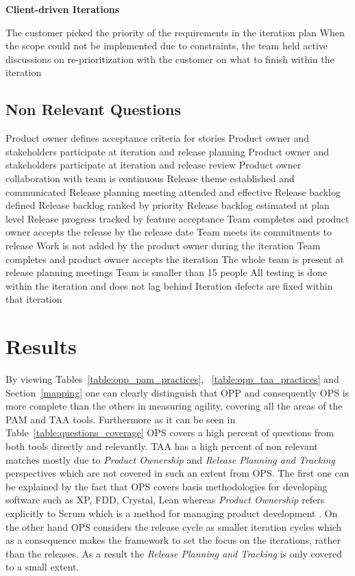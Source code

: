 \textbf{Client-driven Iterations}
\begin{itemize}
	\pam The customer picked the priority of the requirements in the iteration plan
	\pam When the scope could not be implemented due to constraints, the team held  active discussions on re-prioritization with the customer on what to finish within the iteration 
\end{itemize}

\subsection{Non Relevant Questions}

\begin{itemize}
	\taanr Product owner defines acceptance criteria for stories 
	\taanr Product owner and stakeholders participate at iteration and release planning 
	\taanr Product owner and stakeholders participate at iteration and release review 
	\taanr Product owner collaboration with team is continuous 
	\taanr Release theme established and communicated 
	\taanr Release planning meeting attended and effective 
	\taanr Release backlog defined 
	\taanr Release backlog ranked by priority 
	\taanr Release backlog estimated at plan level 
	\taanr Release progress tracked by feature acceptance 
	\taanr Team completes and product owner accepts the release by the release date
	\taanr Team meets its commitments to release 
	\taanr Work is not added by the product owner during the iteration 
	\taanr Team completes and product owner accepts the iteration 
	\taanr The whole team is present at release planning meetings 
	\taanr Team is smaller than 15 people 
	\taanr All testing is done within the iteration and does not lag behind 
	\taanr Iteration defects are fixed within that iteration 
\end{itemize}

\section{Results}
By viewing Tables~\ref{table:opp_pam_practices}, ~\ref{table:opp_taa_practices} and Section~\ref{mapping} one can clearly distinguish that OPP and consequently OPS is more complete than the others in measuring agility, covering all the areas of the PAM and TAA tools. Furthermore as it can be seen in Table~\ref{table:questions_coverage} OPS covers a high percent of questions from both tools directly and relevantly. TAA has a high percent of non relevant matches mostly due to \textit{Product Ownership} and \textit{Release Planning and Tracking} perspectives which are not covered in such an extent from OPS. The first one can be explained by the fact that OPS covers basis methodologies for developing software such as XP, FDD, Crystal, Lean \cite[p. 44]{sventha_dissertation} whereas \textit{Product Ownership} refers explicitly to Scrum which is a method for managing product development \cite{koch2005agile}. On the other hand OPS considers the release cycle as smaller iteration cycles \cite[p. 13]{sventha_dissertation} which as a consequence makes the framework to set the focus on the iterations, rather than the releases. As a result the \textit{Release Planning and Tracking} is only covered to a small extent.

